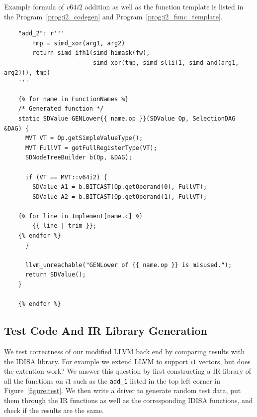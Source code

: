 Example formula of $v64i2$ addition as well as the function template is listed in the Program~\ref{prog:i2_codegen} and Program~\ref{prog:i2_func_template}.

\begin{program}[htbp!]
\begin{verbatim}
    "add_2": r'''
        tmp = simd_xor(arg1, arg2)
        return simd_ifh1(simd_himask(fw),
                         simd_xor(tmp, simd_slli(1, simd_and(arg1, arg2))), tmp)
    '''
\end{verbatim}
\caption[Minimum boolean function for $v64i2$ addition]{Minimum boolean function for $v64i2$ addition.}
\label{prog:i2_codegen}
\end{program}

\begin{program}[htbp!]
\begin{verbatim}
    {% for name in FunctionNames %}
    /* Generated function */
    static SDValue GENLower{{ name.op }}(SDValue Op, SelectionDAG &DAG) {
      MVT VT = Op.getSimpleValueType();
      MVT FullVT = getFullRegisterType(VT);
      SDNodeTreeBuilder b(Op, &DAG);

      if (VT == MVT::v64i2) {
        SDValue A1 = b.BITCAST(Op.getOperand(0), FullVT);
        SDValue A2 = b.BITCAST(Op.getOperand(1), FullVT);

    {% for line in Implement[name.c] %}
        {{ line | trim }};
    {% endfor %}
      }

      llvm_unreachable("GENLower of {{ name.op }} is misused.");
      return SDValue();
    }

    {% endfor %}
\end{verbatim}
\caption[Custom lowering function template for $v64i2$]{Custom lowering function template for $v64i2$. This template file generates one function for each operation.}
\label{prog:i2_func_template}
\end{program}

\subsection{Test Code And IR Library Generation}
We test correctness of our modified LLVM back end by comparing results with the IDISA library. For example we extend LLVM to support $i1$ vectors, but does the extention work? We answer this question by first constructing a IR library of all the functions on $i1$ such as the {\tt add\_1} listed in the top left corner in Figure~\ref{figure:test}. We then write a driver to generate random test data, put them through the IR functions as well as the corresponding IDISA functions, and check if the results are the same.

